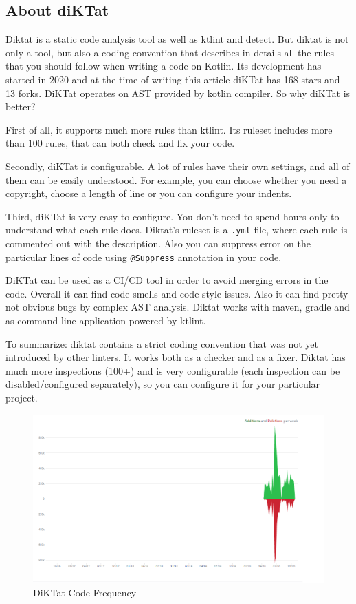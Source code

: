 \subsection{About diKTat}
Diktat is a static code analysis tool as well as ktlint and detect. But diktat is not only a tool, but also a coding convention that describes in details all the rules that you should follow when writing a code on Kotlin. Its development has started in 2020 and at the time of writing this article diKTat has 168 stars and 13 forks. DiKTat operates on AST provided by kotlin compiler. So why diKTat is better?

First of all, it supports much more rules than ktlint. Its ruleset includes more than 100 rules, that can both check and fix your code.

Secondly, diKTat is configurable. A lot of rules have their own settings, and all of them can be easily understood. For example, you can choose whether you need a copyright, choose a length of line or you can configure your indents.

Third, diKTat is very easy to configure. You don’t need to spend hours only to understand what each rule does. Diktat’s ruleset is a \texttt{.yml} file, where each rule is commented out with the description. Also you can suppress error on the particular lines of code using \texttt{@Suppress} annotation in your code.

DiKTat can be used as a CI/CD tool in order to avoid merging errors in the code. Overall it can find code smells and code style issues. Also it can find pretty not obvious bugs by complex AST analysis. Diktat works with maven, gradle and as command-line application powered by ktlint.

To summarize: diktat contains a strict coding convention that was not yet introduced by other linters. It works both as a checker and as a fixer. Diktat has much more inspections (100+) and is very configurable (each inspection can be disabled/configured separately), so you can configure it for your particular project.

\begin{figure}[H]
    \centering
    \includegraphics[scale = 0.6]{pictures/diktat.png}
    \caption{DiKTat Code Frequency}
    \label{fig:png_diktat}
\end{figure}

